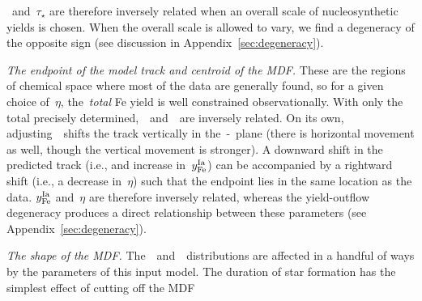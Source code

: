 \documentclass[ms.tex]{subfiles}
\begin{document}
\yfecc~and~$\tau_\star$ are therefore inversely related when an overall scale
of nucleosynthetic yields is chosen.
When the overall scale is allowed to vary, we find a degeneracy of the opposite
sign (see discussion in Appendix~\ref{sec:degeneracy}).
\par
\textit{The endpoint of the model track and centroid of the MDF.}
These are the regions of chemical space where most of the
data are generally found, so for a given choice of~$\eta$, the~\textit{total}
Fe yield is well constrained observationally.
With only the total precisely determined,~\yfecc~and~\yfeia~are inversely
related.
On its own, adjusting~\yfeia~shifts the track vertically in the~\afe-\feh~plane
(there is horizontal movement as well, though the vertical movement is
stronger).
A downward shift in the predicted track (i.e., and increase in~$y_\text{Fe}^\text{Ia}$) can be
accompanied by a rightward shift (i.e., a decrease in~$\eta$) such that the
endpoint lies in the same location as the data.
$y_\text{Fe}^\text{Ia}$ and~$\eta$ are therefore inversely related, whereas the yield-outflow
degeneracy produces a direct relationship between these parameters
(see Appendix~\ref{sec:degeneracy}).
\par
\textit{The shape of the MDF.}
The~\afe~and~\feh~distributions are affected in a handful of ways by the
parameters of this input model.
The duration of star formation has the simplest effect of cutting off the MDF
\end{document}
